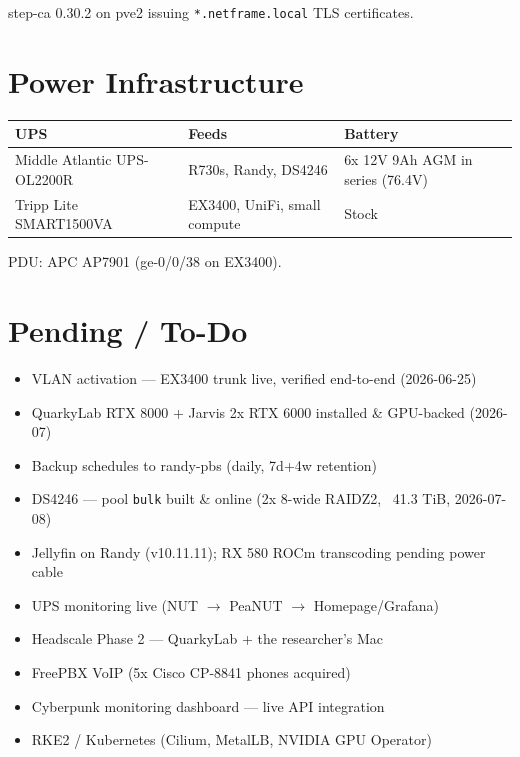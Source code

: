 \documentclass[11pt,letterpaper]{article}
\begin{document}
step-ca 0.30.2 on pve2 issuing \texttt{*.netframe.local} TLS certificates.

\section{Power Infrastructure}

\begin{tabular}{lll}
\toprule
\textbf{UPS} & \textbf{Feeds} & \textbf{Battery} \\
\midrule
Middle Atlantic UPS-OL2200R & R730s, Randy, DS4246 & 6x 12V 9Ah AGM in series (76.4V) \\
Tripp Lite SMART1500VA & EX3400, UniFi, small compute & Stock \\
\bottomrule
\end{tabular}

PDU: APC AP7901 (ge-0/0/38 on EX3400).

\section{Pending / To-Do}

\begin{itemize}[leftmargin=*]
  \item[\color{nfgreen}$\checkmark$] VLAN activation — EX3400 trunk live, verified end-to-end (2026-06-25)
  \item[\color{nfgreen}$\checkmark$] QuarkyLab RTX 8000 + Jarvis 2x RTX 6000 installed \& GPU-backed (2026-07)
  \item[\color{nfgreen}$\checkmark$] Backup schedules to randy-pbs (daily, 7d+4w retention)
  \item[\color{nfgreen}$\checkmark$] DS4246 — pool \texttt{bulk} built \& online (2x 8-wide RAIDZ2, ~41.3 TiB, 2026-07-08)
  \item[\color{nfgreen}$\checkmark$] Jellyfin on Randy (v10.11.11); RX 580 ROCm transcoding pending power cable
  \item[\color{nfgreen}$\checkmark$] UPS monitoring live (NUT $\rightarrow$ PeaNUT $\rightarrow$ Homepage/Grafana)
  \item[\color{nfred}$\square$] Headscale Phase 2 — QuarkyLab + the researcher's Mac
  \item[\color{nfred}$\square$] FreePBX VoIP (5x Cisco CP-8841 phones acquired)
  \item[\color{nfred}$\square$] Cyberpunk monitoring dashboard — live API integration
  \item[\color{nfred}$\square$] RKE2 / Kubernetes (Cilium, MetalLB, NVIDIA GPU Operator)
\end{itemize}
\end{document}
